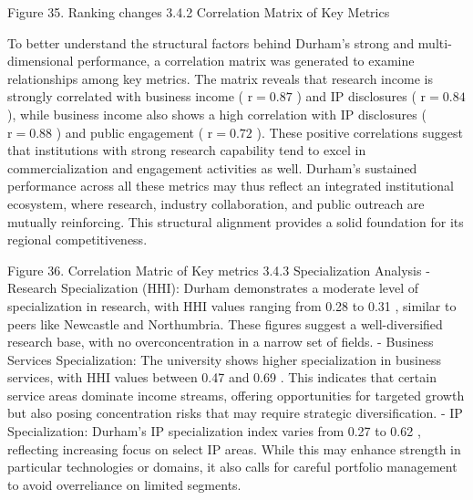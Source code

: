 Figure 35. Ranking changes
3.4.2 Correlation Matrix of Key Metrics

To better understand the structural factors behind Durham's strong and multi-dimensional performance, a correlation matrix was generated to examine relationships among key metrics. The matrix reveals that research income is strongly correlated with business income ( $\mathrm{r}=0.87$ ) and IP disclosures ( $\mathrm{r}=0.84$ ), while business income also shows a high correlation with IP disclosures ( $\mathrm{r}=0.88$ ) and public engagement ( $\mathrm{r}=0.72$ ). These positive correlations suggest that institutions with strong research capability tend to excel in commercialization and engagement activities as well. Durham's sustained performance across all these metrics may thus reflect an integrated institutional ecosystem, where research, industry collaboration, and public outreach are mutually reinforcing. This structural alignment provides a solid foundation for its regional competitiveness.

Figure 36. Correlation Matric of Key metrics
3.4.3 Specialization Analysis
- Research Specialization (HHI): Durham demonstrates a moderate level of specialization in research, with HHI values ranging from 0.28 to 0.31 , similar to peers like Newcastle and Northumbria. These figures suggest a well-diversified research base, with no overconcentration in a narrow set of fields.
- Business Services Specialization: The university shows higher specialization in business services, with HHI values between 0.47 and 0.69 . This indicates that certain service areas dominate income streams, offering opportunities for targeted growth but also posing concentration risks that may require strategic diversification.
- IP Specialization: Durham's IP specialization index varies from 0.27 to 0.62 , reflecting increasing focus on select IP areas. While this may enhance strength in particular technologies or domains, it also calls for careful portfolio management to avoid overreliance on limited segments.

